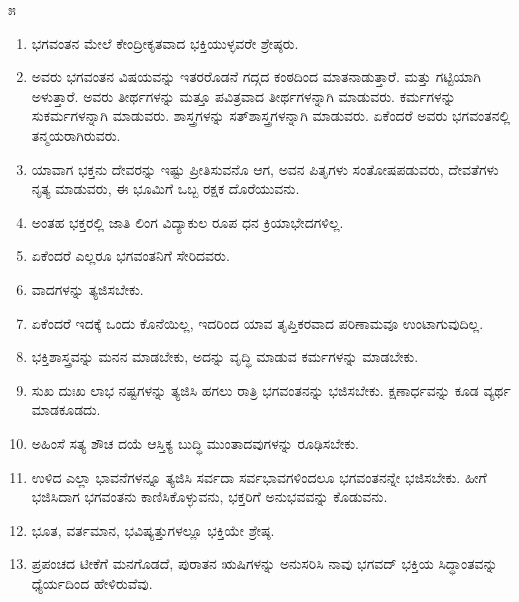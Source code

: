\begin{center}
೫
\end{center}

\begin{enumerate}
\item ಭಗವಂತನ ಮೇಲೆ ಕೇಂದ್ರೀಕೃತವಾದ ಭಕ್ತಿಯುಳ್ಳವರೇ ಶ್ರೇಷ್ಠರು.

 \item ಅವರು ಭಗವಂತನ ವಿಷಯವನ್ನು ಇತರರೊಡನೆ ಗದ್ಗದ ಕಂಠದಿಂದ ಮಾತನಾಡುತ್ತಾರೆ. ಮತ್ತು ಗಟ್ಟಿಯಾಗಿ ಅಳುತ್ತಾರೆ. ಅವರು ತೀರ್ಥಗಳನ್ನು ಮತ್ತೂ ಪವಿತ್ರವಾದ ತೀರ್ಥಗಳನ್ನಾಗಿ ಮಾಡುವರು. ಕರ್ಮಗಳನ್ನು ಸುಕರ್ಮಗಳನ್ನಾಗಿ ಮಾಡುವರು. ಶಾಸ್ತ್ರಗಳನ್ನು ಸತ್​ಶಾಸ್ತ್ರಗಳನ್ನಾಗಿ ಮಾಡುವರು. ಏಕೆಂದರೆ ಅವರು ಭಗವಂತನಲ್ಲಿ ತನ್ಮಯರಾಗಿರುವರು.

 \item ಯಾವಾಗ ಭಕ್ತನು ದೇವರನ್ನು ಇಷ್ಟು ಪ್ರೀತಿಸುವನೊ ಆಗ, ಅವನ ಪಿತೃಗಳು ಸಂತೋಷಪಡುವರು, ದೇವತೆಗಳು ನೃತ್ಯ ಮಾಡುವರು, ಈ ಭೂಮಿಗೆ ಒಬ್ಬ ರಕ್ಷಕ ದೊರೆಯುವನು.

 \item ಅಂತಹ ಭಕ್ತರಲ್ಲಿ ಜಾತಿ ಲಿಂಗ ವಿದ್ಯಾಕುಲ ರೂಪ ಧನ ಕ್ರಿಯಾಭೇದಗಳಿಲ್ಲ.

 \item ಏಕೆಂದರೆ ಎಲ್ಲರೂ ಭಗವಂತನಿಗೆ ಸೇರಿದವರು.

 \item ವಾದಗಳನ್ನು ತ್ಯಜಿಸಬೇಕು.

 \item ಏಕೆಂದರೆ ಇದಕ್ಕೆ ಒಂದು ಕೊನೆಯಿಲ್ಲ, ಇದರಿಂದ ಯಾವ ತೃಪ್ತಿಕರವಾದ ಪರಿಣಾಮವೂ ಉಂಟಾಗುವುದಿಲ್ಲ.

 \item ಭಕ್ತಿಶಾಸ್ತ್ರವನ್ನು ಮನನ ಮಾಡಬೇಕು, ಅದನ್ನು ವೃದ್ಧಿ ಮಾಡುವ ಕರ್ಮಗಳನ್ನು ಮಾಡಬೇಕು.

 \item ಸುಖ ದುಃಖ ಲಾಭ ನಷ್ಟಗಳನ್ನು ತ್ಯಜಿಸಿ ಹಗಲು ರಾತ್ರಿ ಭಗವಂತನನ್ನು ಭಜಿಸಬೇಕು. ಕ್ಷಣಾರ್ಧವನ್ನು ಕೂಡ ವ್ಯರ್ಥ ಮಾಡಕೂಡದು.

 \item ಅಹಿಂಸೆ ಸತ್ಯ ಶೌಚ ದಯೆ ಆಸ್ತಿಕ್ಯ ಬುದ್ಧಿ ಮುಂತಾದವುಗಳನ್ನು ರೂಢಿಸಬೇಕು.

 \item ಉಳಿದ ಎಲ್ಲಾ ಭಾವನೆಗಳನ್ನೂ ತ್ಯಜಿಸಿ ಸರ್ವದಾ ಸರ್ವಭಾವಗಳಿಂದಲೂ ಭಗವಂತನನ್ನೇ ಭಜಿಸಬೇಕು. ಹೀಗೆ ಭಜಿಸಿದಾಗ ಭಗವಂತನು ಕಾಣಿಸಿಕೊಳ್ಳುವನು, ಭಕ್ತರಿಗೆ ಅನುಭವವನ್ನು ಕೊಡುವನು.

 \item ಭೂತ, ವರ್ತಮಾನ, ಭವಿಷ್ಯತ್ತುಗಳಲ್ಲೂ ಭಕ್ತಿಯೇ ಶ್ರೇಷ್ಠ.

 \item ಪ್ರಪಂಚದ ಟೀಕೆಗೆ ಮನಗೊಡದೆ, ಪುರಾತನ ಋಷಿಗಳನ್ನು ಅನುಸರಿಸಿ ನಾವು ಭಗವದ್​ ಭಕ್ತಿಯ ಸಿದ್ಧಾಂತವನ್ನು ಧ್ಯೆರ್ಯದಿಂದ ಹೇಳಿರುವೆವು.

\end{enumerate}

